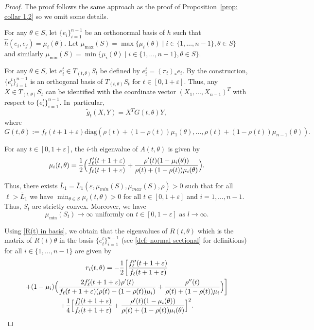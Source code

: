 \documentclass[JEP,XML,SOM,Unicode,NoFloatCountersInSection]{cedram}
\let\sep\mid
\theoremstyle{definition}
\let\eps\varepsilon
\renewcommand{\>}{{\rangle}}
\newcommand{\<}{{\langle}}
\begin{document}
\begin{proof}
The proof follows the same approach as the proof of Proposition~\ref{prop: collar 1,2} so we omit some details.

For any $\theta\in S$, let $\{e_i\}_{i=1}^{n-1}$ be an orthonormal basis of $h$ such that $\hat h(e_i,e_j)=\mu_i(\theta)$. Let $\mu_{\max}(S) = \max\{\mu_i(\theta)\sep i\in\{1,\ldots, n-1\}, \theta\in S\}$ and similarly $\mu_{\min}(S) = \min\{\mu_i(\theta)\sep i\in\{1,\ldots, n-1\}, \theta\in S\}$.

For any $\theta\in S$, let $e_i^t\in T_{(t,\theta)}S_t$ be defined by $e_i^t = (\pi_t)_{*}e_i.$ By the construction, $\{e_i^t\}_{i=1}^{n-1}$ is an orthogonal basis of $T_{(t,\theta)}S_t$ for $t\in[0,1+\eps]$. Thus, any $X\in T_{(t,\theta)}S_t$ can be identified with the coordinate vector $(X_1,\ldots,X_{n-1})^T$ with respect to $\{e_i^t\}_{i=1}^{n-1}$. In~particular,\vspace*{-3pt}
\begin{equation*}
\tilde g_t(X,Y) = X^TG(t,\theta)Y,
\end{equation*}
where\vspace*{-3pt}
\begin{equation*}
G(t,\theta):=f_\ell(t+1+\eps)\text{diag}(\rho(t)+(1-\rho(t))\mu_1(\theta),\dots, \rho(t)+(1-\rho(t))\mu_{n-1}(\theta)).
\end{equation*}

For any $t\in[0,1+\eps]$, the $i$-th eigenvalue of $A(t,\theta)$ is given by
\begin{equation*}
\mu_i(t,\theta) = \frac{1}{2}\Bigl(\frac{f_\ell'(t+1+\eps)}{f_\ell(t+1+\eps)}+\frac{\rho'(t)(1-\mu_i(\theta))}{\rho(t)+(1-\rho(t))\mu_i(\theta)} \Bigr).
\end{equation*}

Thus, there exists $\bar L_1=\bar L_1(\eps, \mu_{min}(S), \mu_{max}(S), \rho)>0$ such that for all $\ell>\bar L_1$ we have $\min_{\theta\in S}\mu_i(t,\theta)>0$ for all $t\in[0,1+\eps]$ and $i=1,\ldots, n-1$. Thus, $S_t$ are strictly convex. Moreover, we have
\begin{equation}\label{unif_increase_mu_i}
\mu_{\min}(S_t) \to \infty \text{ uniformly on } t\in[0,1+\eps] \text{ as } l\to\infty.
\end{equation}

Using \eqref{R(t) in basis}, we obtain that the eigenvalues of $R(t,\theta)$ which is the matrix of $R(t)\theta$ in the basis $\{e_i^t\}_{i=1}^{n-1}$ (see \eqref{def: normal sectional} for definitions) for all $i\in\{1,\ldots, n-1\}$ are given by\vspace*{-3pt}
\begin{multline*}\label{eigenvalues of R(t) 2}
r_i(t,\theta)
=-\frac{1}{2}\biggl[\frac{f''_\ell(t+1+\eps)}{f_\ell(t+1+\eps)}\\
+(1-\mu_i) \Bigl(\frac{2f'_\ell(t+1+\eps)\rho'(t)}{f_\ell(t+1+\eps)(\rho(t)+(1-\rho(t))\mu_i)}+\frac{\rho''(t)}{\rho(t)+(1-\rho(t))\mu_i} \Bigr)\biggr]\\
+\frac{1}{4} \Bigl[\frac{f_\ell'(t+1+\eps)}{f_\ell(t+1+\eps)}+\frac{\rho'(t)(1-\mu_i(\theta))}{\rho(t)+(1-\rho(t))\mu_i(\theta)} \Bigr]^2.
\end{multline*}


\end{proof}
\end{document}
